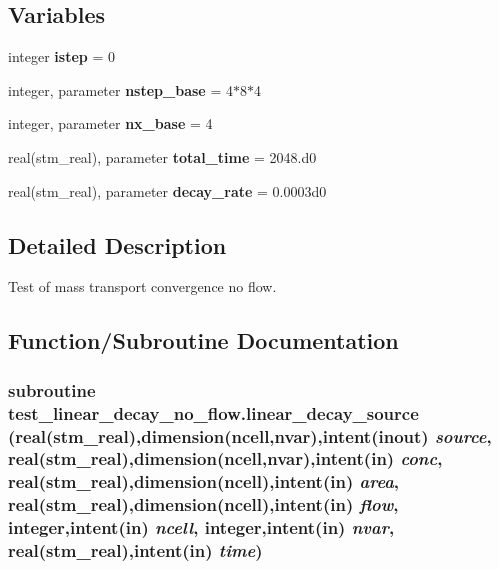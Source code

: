 \subsection*{Variables}
\begin{CompactItemize}
\item 
\hypertarget{a00089_83ec667a10f17b510560a4d074dee36f}{
integer \textbf{istep} = 0}
\label{a00089_83ec667a10f17b510560a4d074dee36f}

\item 
\hypertarget{a00089_109bd13caeb8d5931190cce2e805006e}{
integer, parameter \textbf{nstep\_\-base} = 4$\ast$8$\ast$4}
\label{a00089_109bd13caeb8d5931190cce2e805006e}

\item 
\hypertarget{a00089_ddc48f1a423ab08072b8e56df08504e9}{
integer, parameter \textbf{nx\_\-base} = 4}
\label{a00089_ddc48f1a423ab08072b8e56df08504e9}

\item 
\hypertarget{a00089_8980476ee6f597df257739672ee178a3}{
real(stm\_\-real), parameter \textbf{total\_\-time} = 2048.d0}
\label{a00089_8980476ee6f597df257739672ee178a3}

\item 
\hypertarget{a00089_ac3b150cf92038de6dcd819ef7986520}{
real(stm\_\-real), parameter \textbf{decay\_\-rate} = 0.0003d0}
\label{a00089_ac3b150cf92038de6dcd819ef7986520}

\end{CompactItemize}


\subsection{Detailed Description}
Test of mass transport convergence no flow. 



\subsection{Function/Subroutine Documentation}
\hypertarget{a00089_3da75bc601f8bb62a62f67492360937a}{
\subsubsection[{linear\_\-decay\_\-source}]{\setlength{\rightskip}{0pt plus 5cm}subroutine test\_\-linear\_\-decay\_\-no\_\-flow.linear\_\-decay\_\-source (real(stm\_\-real),dimension(ncell,nvar),intent(inout) {\em source}, \/  real(stm\_\-real),dimension(ncell,nvar),intent(in) {\em conc}, \/  real(stm\_\-real),dimension(ncell),intent(in) {\em area}, \/  real(stm\_\-real),dimension(ncell),intent(in) {\em flow}, \/  integer,intent(in) {\em ncell}, \/  integer,intent(in) {\em nvar}, \/  real(stm\_\-real),intent(in) {\em time})}}
\label{a00089_3da75bc601f8bb62a62f67492360937a}


